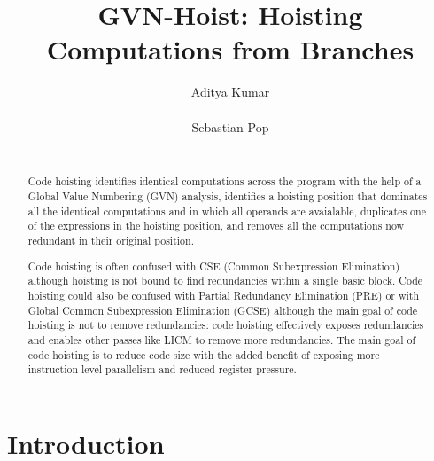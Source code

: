 \documentclass{sig-alternate}
\begin{document}
\def \SCoP {SCoP}
\def \GCC {GCC}
\def \LLVM {LLVM}
\def \SESE {SESE}
\def \CFG {CFG}
\def \SSA {SSA}
\def \scev {scev}

\setlength{\pdfpageheight}{\paperheight}
\setlength{\pdfpagewidth}{\paperwidth}

\title{GVN-Hoist: Hoisting Computations from Branches}


\author{
\alignauthor
Aditya Kumar\\
       \\
\alignauthor
Sebastian Pop\\
       \\
}

\maketitle
\begin{abstract}
  Code hoisting identifies identical computations across the program with the
  help of a Global Value Numbering (GVN) analysis, identifies a hoisting
  position that dominates all the identical computations and in which all
  operands are avaialable, duplicates one of the expressions in the hoisting
  position, and removes all the computations now redundant in their original
  position.

  Code hoisting is often confused with CSE (Common Subexpression Elimination)
  although hoisting is not bound to find redundancies within a single basic
  block.  Code hoisting could also be confused with Partial Redundancy
  Elimination (PRE) or with Global Common Subexpression Elimination (GCSE)
  although the main goal of code hoisting is not to remove redundancies: code
  hoisting effectively exposes redundancies and enables other passes like LICM
  to remove more redundancies.  The main goal of code hoisting is to reduce code
  size with the added benefit of exposing more instruction level parallelism and
  reduced register pressure.
\end{abstract}

\section{Introduction}
\end{document}

